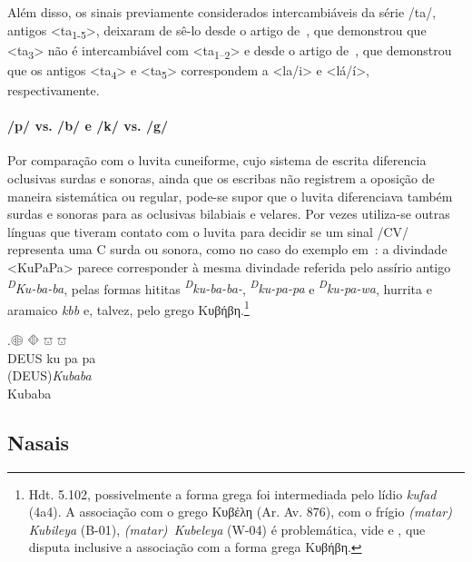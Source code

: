 Além disso, os sinais previamente considerados intercambiáveis da série
/ta/, antigos <ta\textsubscript{1-5}>, deixaram de sê-lo desde o artigo
de~\citet{Rieken2008}, que demonstrou que <ta\textsubscript{3}> não é
intercambiável com <ta\textsubscript{1--2}> e desde o artigo
de~\citet{RiekenYakubovich2010}, que demonstrou que os antigos
<ta\textsubscript{4}> e <ta\textsubscript{5}> correspondem a <la\slash{}i> e
<lá\slash{}í>, respectivamente.

\paragraph{/p/ vs. /b/ e /k/ vs. /g/}
Por comparação com o luvita cuneiforme, cujo sistema de
escrita diferencia oclusivas surdas e sonoras, ainda que os escribas não
registrem a oposição de maneira sistemática ou regular, pode-se supor que o
luvita diferenciava também surdas e sonoras para as oclusivas bilabiais e
velares.
Por vezes utiliza-se outras línguas que tiveram contato com o luvita para
decidir se um sinal /CV/ representa uma C surda ou sonora, como no caso do
exemplo em~\Next: a divindade <KuPaPa> parece corresponder à mesma
divindade referida pelo assírio antigo \emph{\textsuperscript{D}Ku-ba-ba},
pelas formas hititas \emph{\textsuperscript{D}ku-ba-ba-},
\mbox{\emph{\textsuperscript{D}ku-pa-pa}} e \emph{\textsuperscript{D}ku-pa-wa},
hurrita e aramaico \emph{kbb} e, talvez, pelo grego Κυβήβη.\footnote{%
	Hdt. 5.102, possivelmente a forma grega foi intermediada pelo lídio
	\emph{kufad} (4a4).
	A associação com o grego Κυβέλη (Ar. Av. 876), com o frígio
	\emph{(matar) Kubileya} (B-01), \mbox{\emph{(matar) Kubeleya}} (W-04)
	é problemática, vide \citet[280--1]{Obrador2020} e \citet{Oreshko2021},
	que disputa inclusive a associação com a forma grega Κυβήβη.
}


\exg.\Large 𔖖 \Large 𔗜 \Large 𔕸 \Large 𔕸\\
DEUS ku pa pa\\
(DEUS)\emph{Kubaba} \\
Kubaba


\subsection{Nasais}

